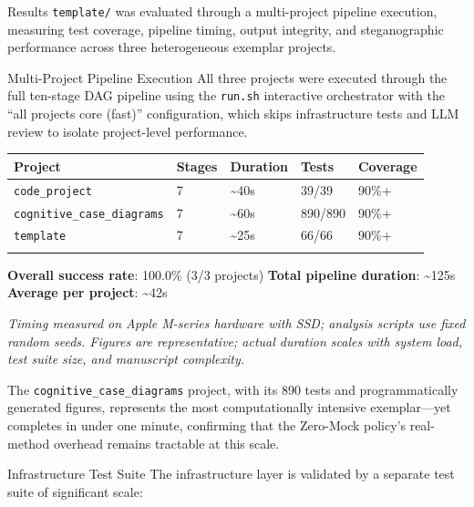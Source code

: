 \documentclass[
  ignorenonframetext,
]{beamer}
\author{\texorpdfstring{}{}}
\date{}
\newcounter{none} %
\begin{document}
\begin{frame}[fragile]{Results}
\protect{}\label{results}
\texttt{template/} was evaluated through a multi-project pipeline
execution, measuring test coverage, pipeline timing, output integrity,
and steganographic performance across three heterogeneous exemplar
projects.

\begin{block}{Multi-Project Pipeline Execution}
\protect{}\label{multi-project-pipeline-execution}
All three projects were executed through the full ten-stage DAG pipeline
using the \texttt{run.sh} interactive orchestrator with the ``all
projects core (fast)'' configuration, which skips infrastructure tests
and LLM review to isolate project-level performance.

{\def\LTcaptype{none} %
\begin{longtable}[]{@{}lllll@{}}
\toprule\noalign{}
Project & Stages & Duration & Tests & Coverage \\
\midrule\noalign{}
\endhead
\texttt{code\_project} & 7 & \textasciitilde40s & 39/39 & 90\%+ \\
\texttt{cognitive\_case\_diagrams} & 7 & \textasciitilde60s & 890/890 &
90\%+ \\
\texttt{template} & 7 & \textasciitilde25s & 66/66 & 90\%+ \\
\bottomrule\noalign{}
\end{longtable}
}

\textbf{Overall success rate}: 100.0\% (3/3 projects) \textbf{Total
pipeline duration}: \textasciitilde125s \textbf{Average per project}:
\textasciitilde42s

\emph{Timing measured on Apple M-series hardware with SSD; analysis
scripts use fixed random seeds. Figures are representative; actual
duration scales with system load, test suite size, and manuscript
complexity.}

The \texttt{cognitive\_case\_diagrams} project, with its 890 tests and
programmatically generated figures, represents the most computationally
intensive exemplar---yet completes in under one minute, confirming that
the Zero-Mock policy's real-method overhead remains tractable at this
scale.
\end{block}

\begin{block}{Infrastructure Test Suite}
\protect{}\label{infrastructure-test-suite}
The infrastructure layer is validated by a separate test suite of
significant scale:


\end{block}
\end{frame}
\end{document}
